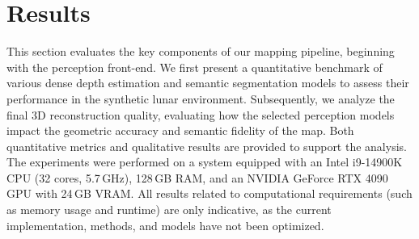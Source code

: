 \section{Results}
\label{sec:results}
This section evaluates the key components of our mapping pipeline, beginning with the perception front-end. We first present a quantitative benchmark of various dense depth estimation and semantic segmentation models to assess their performance in the synthetic lunar environment. Subsequently, we analyze the final 3D reconstruction quality, evaluating how the selected perception models impact the geometric accuracy and semantic fidelity of the map. Both quantitative metrics and qualitative results are provided to support the analysis.
The experiments were performed on a system equipped with an Intel i9-14900K CPU (32 cores, 5.7\,GHz), 128\,GB RAM, and an NVIDIA GeForce RTX 4090 GPU with 24\,GB VRAM.
All results related to computational requirements (such as memory usage and runtime) are only indicative, as the current implementation, methods, and models have not been optimized.

